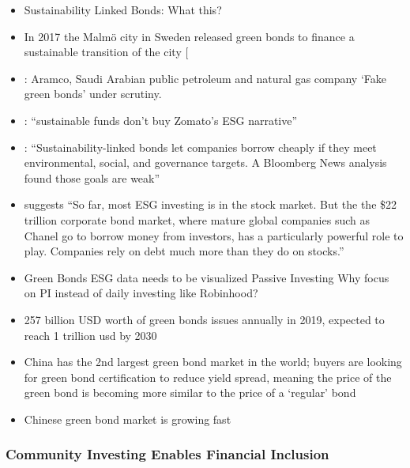 \documentclass[
  letterpaper,
  DIV=11,
  numbers=noendperiod]{scrartcl}
\begin{document}
\begin{itemize}
\item
  Sustainability Linked Bonds: What this?
\item
  In 2017 the Malmö city in Sweden released green bonds to finance a
  sustainable transition of the city {[}
\item
  \citet{anthropocenefixedincomeinstituteafiiAFIIAramcoReplacement2022}:
  Aramco, Saudi Arabian public petroleum and natural gas company `Fake
  green bonds' under scrutiny.
\item
  \citet{shashwatmohantyGreenPushGreenwash2022}: ``sustainable funds
  don't buy Zomato's ESG narrative''
\item
  \citet{priscilaazevedorochaGreenwashingEnters222022}:
  ``Sustainability-linked bonds let companies borrow cheaply if they
  meet environmental, social, and governance targets. A Bloomberg News
  analysis found those goals are weak''
\item
  \citet{priscilaazevedorochaGreenwashingEnters222022} suggests ``So
  far, most ESG investing is in the stock market. But the the \$22
  trillion corporate bond market, where mature global companies such as
  Chanel go to borrow money from investors, has a particularly powerful
  role to play. Companies rely on debt much more than they do on
  stocks.''
\item
  Green Bonds ESG data needs to be visualized Passive Investing Why
  focus on PI instead of daily investing like Robinhood?
\item
  257 billion USD worth of green bonds issues annually in 2019, expected
  to reach 1 trillion usd by 2030 \citet{macaskillThereGreenPremium2021}
\item
  China has the 2nd largest green bond market in the world; buyers are
  looking for green bond certification to reduce yield spread, meaning
  the price of the green bond is becoming more similar to the price of a
  `regular' bond \citet{liWhereGreenBond2022}
\item
  Chinese green bond market is growing fast
  \citet{pengManagingFinancingCosts2022}
\end{itemize}

\subsubsection{Community Investing Enables Financial
Inclusion}\label{community-investing-enables-financial-inclusion}
\end{document}
